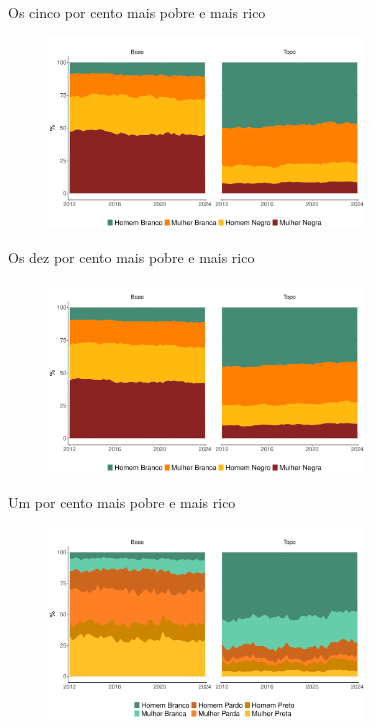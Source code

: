 \documentclass[10pt, xcolor=x11names,compress]{beamer}
\begin{document}
		\begin{frame}{Os cinco por cento mais pobre e mais rico}
		\begin{figure}
			\centering
			\includegraphics[width = 0.75\textwidth]{figures_output/base_topo_5.pdf}
		\end{figure}
	\end{frame}
	
		\begin{frame}{Os dez por cento mais pobre e mais rico}
		\begin{figure}
			\centering
			\includegraphics[width = 0.75\textwidth]{figures_output/base_topo_10.pdf}
		\end{figure}
	\end{frame}
		
		\begin{frame}{Um por cento mais pobre e mais rico}
		\begin{figure}
			\centering
			\includegraphics[width = 0.75\textwidth]{figures_output/base_topo_1_ppb.pdf}
		\end{figure}
	\end{frame}
	
\end{document}
